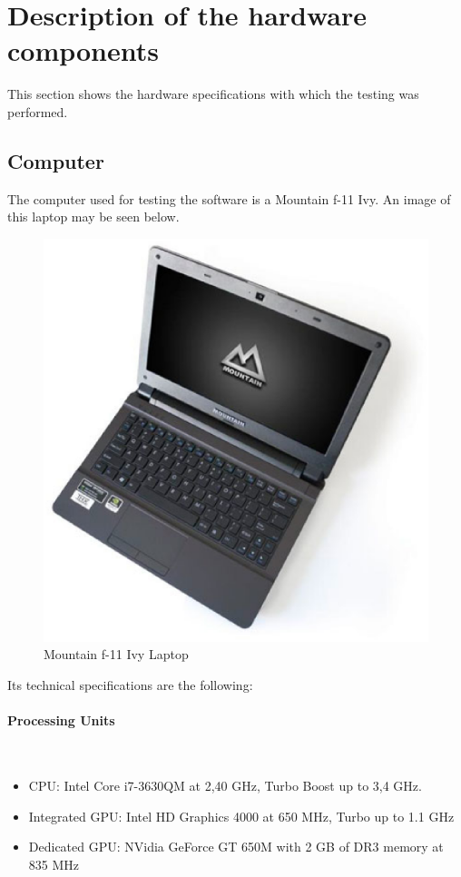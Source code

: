 \section{Description of the hardware components}
This section shows the hardware specifications with which the testing was performed. 

\subsection{Computer}
	The computer used for testing the software is a Mountain f-11 Ivy.  An image of this laptop may be seen below. 

	\begin{figure}[H]
		\begin{center}
	\includegraphics[scale=0.3]{img/mountain.eps}
		\caption[Mountain laptop]{Mountain f-11 Ivy Laptop}
		\end{center}
	\end{figure}

	Its technical specifications are the following: 

	\paragraph{Processing Units} \mbox{}\\
		\begin{itemize}
			\item{CPU: Intel Core i7-3630QM at 2,40 GHz, Turbo Boost up to 3,4 GHz.}
			\item{Integrated GPU:  Intel HD Graphics 4000 at 650 MHz,  Turbo up to 1.1 GHz }
			\item{Dedicated GPU: NVidia GeForce GT 650M with 2 GB of DR3 memory at 835 MHz }
		\end{itemize}

